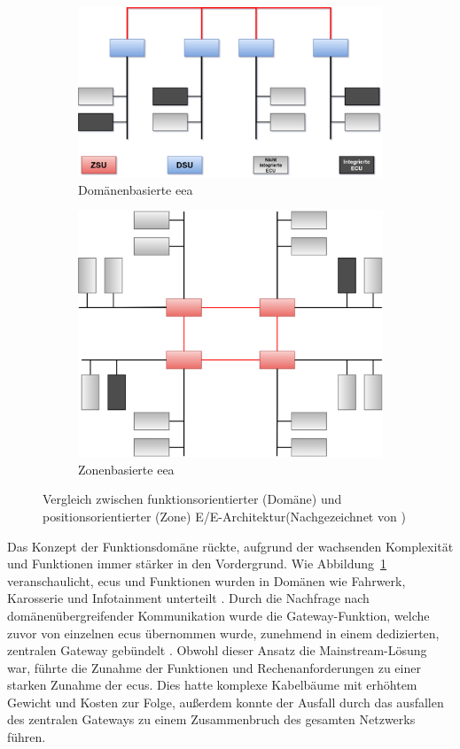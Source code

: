 \begin{figure}[h!]
  \centering
  \begin{subfigure}{.5\textwidth}
    \centering
    \includegraphics[width=\linewidth]{figures/02Grundlagen/Domainbasiert.drawio.png}
    \caption{Domänenbasierte \gls{eea}}
    \label{fig:deea}
  \end{subfigure}%
  \begin{subfigure}{.5\textwidth}
    \centering
    \includegraphics[width=.75\linewidth]{figures/02Grundlagen/Zonenbasiert.drawio.png}
    \caption{Zonenbasierte \gls{eea}}
    \label{fig:zeea}
  \end{subfigure}
  \caption{Vergleich zwischen funktionsorientierter (Domäne) und positionsorientierter (Zone) E/E-Architektur(Nachgezeichnet von \cite{wang2024review})}
  \label{fig:eea}
\end{figure}


Das Konzept der Funktionsdomäne rückte, aufgrund der wachsenden Komplexität und Funktionen immer stärker in den Vordergrund. Wie Abbildung~\ref{fig:deea} veranschaulicht, \glspl{ecu} und Funktionen wurden in Domänen wie Fahrwerk, Karosserie und Infotainment unterteilt \cite{jiang2019vehicle}. Durch die Nachfrage nach domänenübergreifender Kommunikation wurde die Gateway-Funktion, welche zuvor von einzelnen \glspl{ecu} übernommen wurde, zunehmend in einem dedizierten, zentralen Gateway gebündelt \cite{jiang2019vehicle}\cite{zhuRequirementsDrivenAutomotiveElectrical2021}.
Obwohl dieser Ansatz die Mainstream-Lösung war, führte die Zunahme der Funktionen und Rechenanforderungen zu einer starken Zunahme der \glspl{ecu}. Dies hatte komplexe Kabelbäume mit erhöhtem Gewicht und Kosten zur Folge, außerdem konnte der Ausfall durch das ausfallen des zentralen Gateways zu einem Zusammenbruch des gesamten Netzwerks führen.

